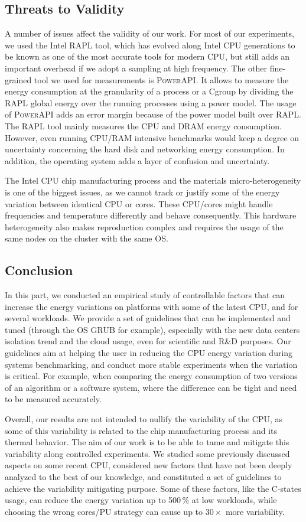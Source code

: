 \subsection{Threats to Validity}
A number of issues affect the validity of our work.
For most of our experiments, we used the Intel RAPL tool, which has evolved along Intel CPU generations to be known as one of the most accurate tools for modern CPU, but still adds an important overhead if we adopt a sampling at high frequency.
The other fine-grained tool we used for measurements is \textsc{PowerAPI}.
It allows to measure the energy consumption at the granularity of a process or a Cgroup by dividing the RAPL global energy over the running processes using a power model.
The usage of \textsc{PowerAPI} adds an error margin because of the power model built over RAPL.
The RAPL tool mainly measures the CPU and DRAM energy consumption.
However, even running CPU/RAM intensive benchmarks would keep a degree on uncertainty concerning the hard disk and networking energy consumption.
In addition, the operating system adds a layer of confusion and uncertainty.

The Intel CPU chip manufacturing process and the materials micro-heterogeneity is one of the biggest issues, as we cannot track or justify some of the energy variation between identical CPU or cores.
These CPU/cores might handle frequencies and temperature differently and behave consequently.
This hardware heterogeneity also makes reproduction complex and requires the usage of the same nodes on the cluster with the same OS.


\subsection{Conclusion}
In this part, we conducted an empirical study of controllable factors that can increase the energy variations on platforms with some of the latest CPU, and for several workloads.
We provide a set of guidelines that can be implemented and tuned (through the OS GRUB for example), especially with the new data centers isolation trend and the cloud usage, even for scientific and R\&D purposes.
Our guidelines aim at helping the user in reducing the CPU energy variation during systems benchmarking, and conduct more stable experiments when the variation is critical.
For example, when comparing the energy consumption of two versions of an algorithm or a software system, where the difference can be tight and need to be measured accurately.

Overall, our results are not intended to nullify the variability of the CPU, as some of this variability is related to the chip manufacturing process and its thermal behavior.
The aim of our work is to be able to tame and mitigate this variability along controlled experiments.
We studied some previously discussed aspects on some recent CPU, considered new factors that have not been deeply analyzed to the best of our knowledge, and constituted a set of guidelines to achieve the variability mitigating purpose.
Some of these factors, like the C-states usage, can reduce the energy variation up to 500\,\% at low workloads, while choosing the wrong cores/PU strategy can cause up to $30\times$ more variability.

